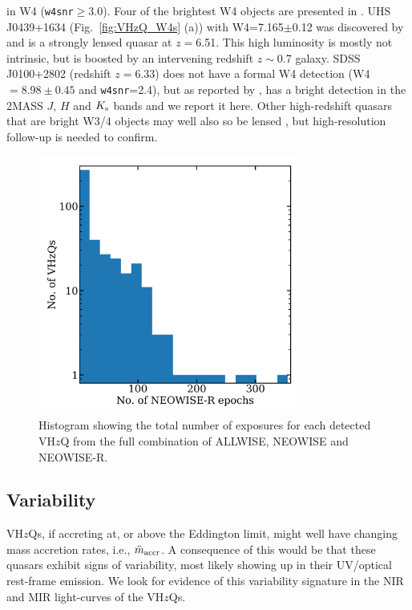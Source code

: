 \documentclass[usenatbib]{mnras}
\begin{document}
in W4 ({\tt w4snr}$\geq$3.0). Four of the brightest W4 objects are
presented in \label{fig:VHzQ_W4s}. UHS J0439+1634
(Fig.~\ref{fig:VHzQ_W4s} (a)) with W4=7.165$\pm$0.12 was discovered by
\citet{Fan2019} and is a strongly lensed quasar at $z=$6.51. This high
luminosity is mostly not intrinsic, but is boosted by an intervening
redshift $z\sim$0.7 galaxy. SDSS J0100+2802 (redshift $z=6.33$) does
not have a formal W4 detection (W4 $=8.98\pm0.45$ and {\tt w4snr}=2.4),
but as reported by \citet{Wu2015}, has a bright detection in the
2MASS $J$, $H$ and $K_{\rm s}$ bands and we report it here.
Other high-redshift quasars that are bright W3/4 objects may well 
also so be lensed \citep[e.g.,][]{Glikman2018lens, Fan2019}, 
but high-resolution follow-up is needed to confirm. 

\begin{figure}
  \centering
  \includegraphics[width=8.5cm]
  {../light_curves/MIR_LCs/NEOWISER_LC_histogramlog_20180827.png}
  \vspace{-16pt}
  \caption[]
  {Histogram showing the total number of exposures for each detected VH$z$Q
    from the full combination of ALLWISE, NEOWISE and NEOWISE-R.} 
  \label{fig:MIR_LC_epochs}
\end{figure}
\subsection{Variability}
VH$z$Qs, if accreting at, or above the Eddington limit, might well
have changing mass accretion rates, i.e., $\ddot{m}_{\rm accr}$. A
consequence of this would be that these quasars exhibit signs of
variability, most likely showing up in their UV/optical rest-frame
emission. We look for evidence of this variability signature in the
NIR and MIR light-curves of the VH$z$Qs.
\end{document}
